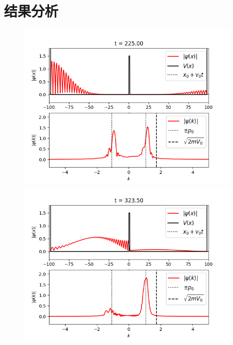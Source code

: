\documentclass[UTF8,ctexart,a4paper,11pt,openany]{article}
\theoremstyle{definition}
\begin{document}
\section{结果分析}%
\begin{figure}[H]
    \begin{minipage}{0.5\textwidth}
        \centering
        \includegraphics[width=\linewidth]{pics/P6.1.png}
    \end{minipage}%
    \begin{minipage}{0.5\textwidth}
        \centering
        \includegraphics[width=\linewidth]{pics/P6.2.png}
    \end{minipage}

\end{figure}
\end{document}
